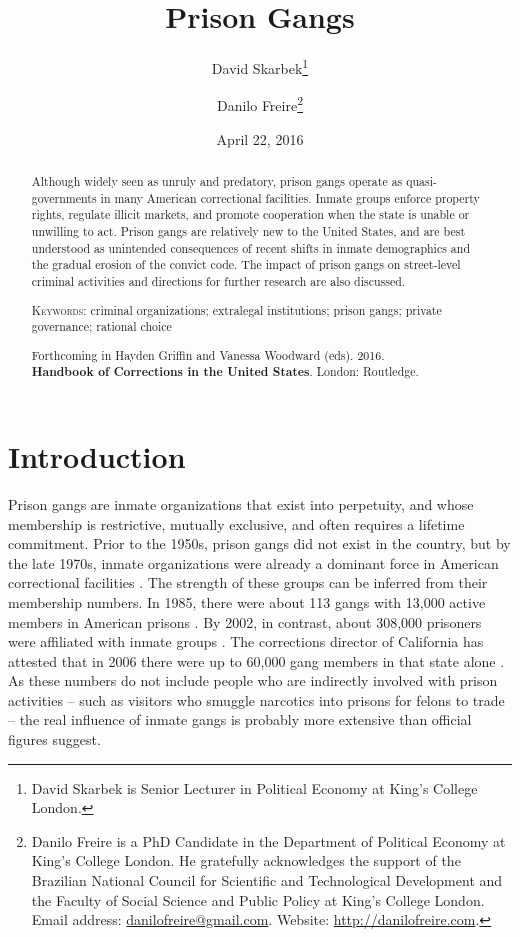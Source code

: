 \documentclass[a4paper, 12pt]{article}
\title{Prison Gangs}
\author{
David Skarbek\thanks{David Skarbek is Senior Lecturer in Political Economy at King's College London.} 
\and 
Danilo Freire\thanks{Danilo Freire is a PhD Candidate in the Department of Political Economy at King's College London. He gratefully acknowledges the support of the Brazilian National Council for Scientific and Technological Development and the Faculty of Social Science and Public Policy at King's College London. Email address: \href{mailto:danilofreire@gmail.com}{danilofreire@gmail.com}. Website: \href{http://danilofreire.com}{http://danilofreire.com}. } 
}
\date{April 22, 2016}
\begin{document}
\maketitle

\doublespacing

\begin{abstract}

\noindent Although widely seen as unruly and predatory, prison gangs operate as quasi-governments in many American correctional facilities. Inmate groups enforce property rights, regulate illicit markets, and promote cooperation when the state is unable or unwilling to act. Prison gangs are relatively new to the United States, and are best understood as unintended consequences of recent shifts in inmate demographics and the gradual erosion of the convict code. The impact of prison gangs on street-level criminal activities and directions for further research are also discussed.

\vspace{.5cm}

\noindent \textsc{Keywords}: criminal organizations; extralegal institutions; prison gangs; private governance; rational choice \\

\vspace{1cm} 

\begin{center}
\noindent Forthcoming in Hayden Griffin and Vanessa Woodward (eds). 2016.\\ \textbf{Handbook of Corrections in the United States}. London: Routledge. 
\end{center}

\end{abstract}

\newpage

\section{Introduction}
\label{sec:intro}

\noindent Prison gangs are inmate organizations that exist into perpetuity, and whose membership is restrictive, mutually exclusive, and often requires a lifetime commitment. Prior to the 1950s, prison gangs did not exist in the country, but by the late 1970s, inmate organizations were already a dominant force in American correctional facilities \citep[e.g.][]{fleisher2001overview,howell2015history,wells2002study}. The strength of these groups can be inferred from their membership numbers. In 1985, there were about 113 gangs with 13,000 active members in American prisons \citep{camp1985prison}. By 2002, in contrast, about 308,000 prisoners were affiliated with inmate groups \citep{winterdyk2010managing}. The corrections director of California has attested that in 2006 there were up to 60,000 gang members in that state alone \citep{petersilia2006understanding}. As these numbers do not include people who are indirectly involved with prison activities -- such as visitors who smuggle narcotics into prisons for felons to trade \citep{crewe2006prison} -- the real influence of inmate gangs is probably more extensive than official figures suggest.
\end{document}
